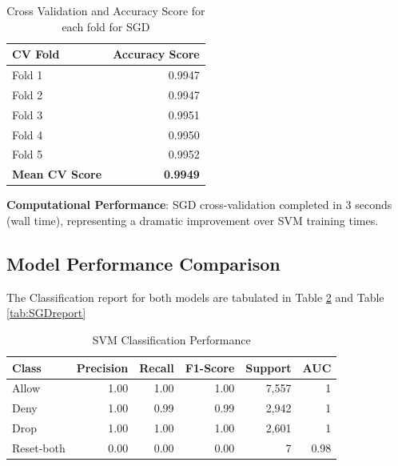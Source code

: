 \documentclass[12pt,a4paper]{article}
\begin{document}
\begin{table}[H]
    \centering
    \caption{Cross Validation and Accuracy Score for each fold for SGD}
    \begin{tabular}{|l|r|}
    \hline
    \textbf{CV Fold} & \textbf{Accuracy Score} \\
    \hline
    Fold 1 & 0.9947 \\
    \hline
    Fold 2 & 0.9947 \\
    \hline
    Fold 3 & 0.9951 \\
    \hline
    Fold 4 & 0.9950 \\
    \hline
    Fold 5 & 0.9952 \\
    \hline
    \textbf{Mean CV Score} & \textbf{0.9949} \\
    \hline
    \end{tabular}
    \label{tab:SGDCV}
\end{table}
    

\textbf{Computational Performance}: SGD cross-validation completed in 3 seconds (wall time), representing a dramatic improvement over SVM training times.

\subsection{Model Performance Comparison}

The Classification report for both models are tabulated in Table \ref{tab:SVMreport} and Table \ref{tab:SGDreport}

\begin{table}[H]
    \centering
    \caption{SVM Classification Performance}
    \begin{tabular}{|l|r|r|r|r|r|}
    \hline
    \textbf{Class} & \textbf{Precision} & \textbf{Recall} & \textbf{F1-Score} & \textbf{Support} & \textbf{AUC} \\
    \hline
    Allow & 1.00 & 1.00 & 1.00 & 7,557 & 1 \\
    \hline
    Deny & 1.00 & 0.99 & 0.99 & 2,942 & 1 \\
    \hline
    Drop & 1.00 & 1.00 & 1.00 & 2,601 & 1 \\
    \hline
    Reset-both & 0.00 & 0.00 & 0.00 & 7 & 0.98 \\
    \hline
    \end{tabular}
    \label{tab:SVMreport}
\end{table}
\end{document}
